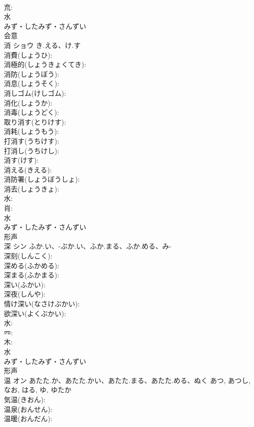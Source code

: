 \documentclass[8pt]{extreport}
\begin{document}
\begin{CJK}{UTF8}{min}
\\	㐬: 
\\	水	
\\	みず・したみず・さんずい	
\\	会意 
\\	消	ショウ	き.える、け.す		
\\	消費(しょうひ): 
\\	消極的(しょうきょくてき): 
\\	消防(しょうぼう): 
\\	消息(しょうそく): 
\\	消しゴム(けしゴム): 
\\	消化(しょうか): 
\\	消毒(しょうどく): 
\\	取り消す(とりけす): 
\\	消耗(しょうもう): 
\\	打消す(うちけす): 
\\	打消し(うちけし): 
\\	消す(けす): 
\\	消える(きえる): 
\\	消防署(しょうぼうしょ): 
\\	消去(しょうきょ): 
\\	水: 
\\	肖: 
\\	水	
\\	みず・したみず・さんずい	
\\	形声 
\\	深	シン	ふか.い、-ぶか.い、ふか.まる、ふか.める、み-		
\\	深刻(しんこく): 
\\	深める(ふかめる): 
\\	深まる(ふかまる): 
\\	深い(ふかい): 
\\	深夜(しんや): 
\\	情け深い(なさけぶかい): 
\\	欲深い(よくぶかい): 
\\	水: 
\\	㓁: 
\\	木: 
\\	水	
\\	みず・したみず・さんずい	
\\	形声 
\\	温	オン	あたた.か、あたた.かい、あたた.まる、あたた.める、ぬく	あつ, あつし, なお, はる, ゆ, ゆたか	
\\	気温(きおん): 
\\	温泉(おんせん): 
\\	温暖(おんだん): 

\end{CJK}
\end{document}
